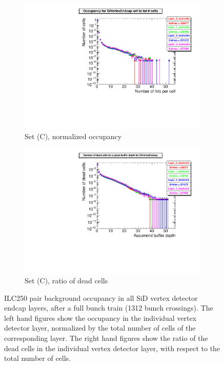 \begin{figure}[htb]
\begin{subfigure}[b]{0.49\textwidth}
    \includegraphics[width=\textwidth]{Figures/Pairs/Appendix/occupancy_numcells_SiVertexEndcap_ILC250_SetC.pdf}
   \caption{Set (C), normalized occupancy}
   \end{subfigure}
   \hfill
    \begin{subfigure}[b]{0.49\textwidth}
   \centering
    \includegraphics[width=\textwidth]{Figures/Pairs/Appendix/occupancy_deadcells_SiVertexEndcap_ILC250_SetC.pdf}
   \caption{Set (C), ratio of dead cells}
   \end{subfigure}
   \caption[Pair background occupancy in all SiD vertex detector endcap layers for the ILC250]{ILC250 pair background occupancy in all SiD vertex detector endcap layers, after a full bunch train (1312 bunch crossings).
   The left hand figures show the occupancy in the individual vertex detector layer, normalized by the total number of cells of the corresponding layer.
   The right hand figures show the ratio of the dead cells in the individual vertex detector layer, with respect to the total number of cells.
   }
   \label{fig:PairBkg:ILC250_Occupancy_Layers_VXDEndcap}
 \end{figure}
 
